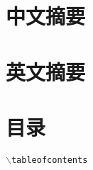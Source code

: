 \section{中文摘要}
\label{sec:abstract-chs}


\section{英文摘要}
\label{sec:abstract-eng}

\section{目录}
\label{sec:toc}

\texttt{$\backslash$tableofcontents}


